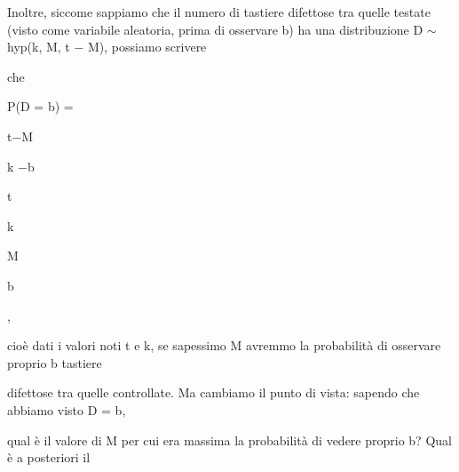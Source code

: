 \documentclass[a4paper,portrait,12pt]{article}
\begin{document}
\begin{flushleft}
Inoltre, siccome sappiamo che il numero di tastiere difettose tra quelle testate (visto come variabile aleatoria, prima di osservare b) ha una distribuzione D $\sim$ hyp(k, M, t $-$ M), possiamo scrivere
\end{flushleft}


\begin{flushleft}
che
\end{flushleft}


\begin{flushleft}
P(D = b) =
\end{flushleft}





\begin{flushleft}
t$-$M
\end{flushleft}


\begin{flushleft}
k $-$b
\end{flushleft}


\begin{flushleft}
t
\end{flushleft}


\begin{flushleft}
k
\end{flushleft}





\begin{flushleft}
M
\end{flushleft}


\begin{flushleft}
b
\end{flushleft}





,





\begin{flushleft}
cio\`{e} dati i valori noti t e k, se sapessimo M avremmo la probabilit\`{a} di osservare proprio b tastiere
\end{flushleft}


\begin{flushleft}
difettose tra quelle controllate. Ma cambiamo il punto di vista: sapendo che abbiamo visto D = b,
\end{flushleft}


\begin{flushleft}
qual \`{e} il valore di M per cui era massima la probabilit\`{a} di vedere proprio b? Qual \`{e} a posteriori il
\end{flushleft}
\end{document}
